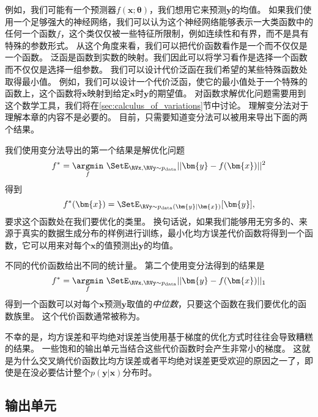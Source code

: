 例如，我们可能有一个预测器$f(\bm{x}; \bm{\theta})$，我们想用它来预测$\bm{y}$的均值。
如果我们使用一个足够强大的神经网络，我们可以认为这个神经网络能够表示一大类函数中的任何一个函数$f$，这个类仅仅被一些特征所限制，例如连续性和有界，而不是具有特殊的参数形式。
从这个角度来看，我们可以把代价函数看作是一个而不仅仅是一个函数。
泛函是函数到实数的映射。我们因此可以将学习看作是选择一个函数而不仅仅是选择一组参数。
我们可以设计代价泛函在我们希望的某些特殊函数处取得最小值。
例如，我们可以设计一个代价泛函，使它的最小值处于一个特殊的函数上，这个函数将$\bm{x}$映射到给定$\bm{x}$时$\bm{y}$的期望值。
对函数求解优化问题需要用到这个数学工具，我们将在\ref{sec:calculus_of_variations}节中讨论。
理解变分法对于理解本章的内容不是必要的。
目前，只需要知道变分法可以被用来导出下面的两个结果。


我们使用变分法导出的第一个结果是解优化问题
\begin{equation}
f^* = \underset{f}{\argmin}  \ \SetE_{\RVx, \RVy \sim  p_\text{data}} ||\bm{y}-f(\bm{x})||^2
\end{equation}
得到
\begin{equation}
f^*(\bm{x}) = \SetE_{\RVy\sim p_\text{data}(\bm{y}|\bm{x})} [\bm{y}],
\end{equation}
要求这个函数处在我们要优化的类里。
换句话说，如果我们能够用无穷多的、来源于真实的数据生成分布的样例进行训练，最小化均方误差代价函数将得到一个函数，它可以用来对每个$\bm{x}$的值预测出$\bm{y}$的均值。

不同的代价函数给出不同的统计量。
第二个使用变分法得到的结果是
\begin{equation}
f^* = \underset{f}{\argmin} \ \SetE_{\RVx, \RVy \sim  p_\text{data}} ||\bm{y} - f(\bm{x})||_1
\end{equation}
得到一个函数可以对每个$\bm{x}$预测$\bm{y}$取值的\emph{中位数}，只要这个函数在我们要优化的函数族里。
这个代价函数通常被称为。

不幸的是，均方误差和平均绝对误差当使用基于梯度的优化方式时往往会导致糟糕的结果。
一些饱和的输出单元当结合这些代价函数时会产生非常小的梯度。
这就是为什么交叉熵代价函数比均方误差或者平均绝对误差更受欢迎的原因之一了，即使是在没必要估计整个$p(\bm{y}|\bm{x})$分布时。


\subsection{输出单元}
\label{sec:output_units}

